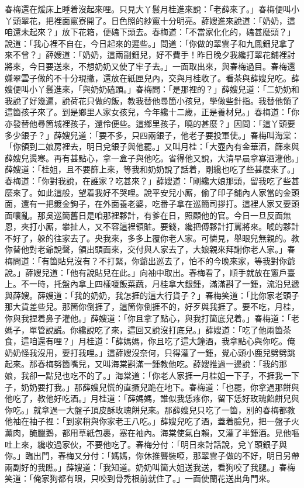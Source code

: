 春梅還在煖床上睡着沒起來哩。{}只見大丫鬟月桂進來說：「老薛來了。」春梅便叫小丫頭翠花，把裡面窻寮開了。日色照的紗窻十分明亮。薛嫂進來說道：「奶奶，這咱還未起來？」放下花箱，便磕下頭去。春梅道：「不當家化化的，磕甚麼頭？」說道：「我心裡不自在，今日起來的遲些。」問道：「你做的翠雲子和九鳳鈿兒拿了來不曾？」薛嫂道：「奶奶，這兩副鈿兒，好不費手！昨日晚夕我纔打翠花鋪裡討將來，今日要送來，不想奶奶又使了牢子去。」一面取出來，與春梅過目。春梅還嫌翠雲子做的不十分現撇，{}還放在紙匣兒內，交與月桂收了。看茶與薛嫂兒吃。薛嫂便叫小丫鬟進來，「與奶奶磕頭。」春梅問：「是那裡的？」薛嫂兒道：「二奶奶和我說了好幾遍，說荷花只做的飯，教我替他尋箇小孩兒，學做些針指。我替他領了這箇孩子來了。到是鄉里人家女孩兒，今年纔十二歲，正是養材兒。」春梅道：「你亦發替他尋箇城裡孩子，還伶便些。這鄉里孩子，曉的甚麼？」因問：「這丫頭要多少銀子？」薛嫂兒道：「要不多，只四兩銀子，他老子要投軍使。」春梅叫海棠：「你領到二娘房裡去，明日兌銀子與他罷。」又叫月桂：「大壺內有金華酒，篩來與薛嫂兒燙寒。再有甚點心，拿一盒子與他吃。省得他又說，大清早晨拿寡酒灌他。」薛嫂道：「桂姐，且不要篩上來，等我和奶奶說了話着，剛纔也吃了些甚麼來了。」春梅道：「你對我說，在誰家？吃甚來？」薛嫂道：「剛纔大娘那頭，留我吃了些甚麼來了。如此這般，望着我好不哭哩。說平安兒小厮，偷了印子鋪內人家當的金頭面，還有一把鍍金鉤子，在外面養老婆，吃番子拿在巡簡司拶打。這裡人家又要頭面嚷亂。那吳巡簡舊日是咱那裡夥計，有爹在日，照顧他的官。今日一旦反面無恩，夾打小厮，攀扯人，又不容這裡領賍。要錢，纔把傅夥計打罵將來。唬的夥計不好了，躲的往家去了。央我來，多多上覆你老人家。可憐見，舉眼兒無親的。教你替他對老爺說聲，領出頭面來，交付與人家去了，大娘親來拜謝你老人家。」春梅問道：「有箇貼兒沒有？不打緊，你爺出巡去了，怕不的今晚來家，等我對你爺說。」{}薛嫂兒道：「他有說貼兒在此。」向袖中取出。春梅看了，順手就放在窻戶臺上。不一時，托盤內拿上四樣嗄飯菜蔬，月桂拿大銀鍾，滿滿斟了一鍾，流沿兒遞與薛嫂。薛嫂道：「我的奶奶，我怎捱的這大行貨子？」春梅笑道：「比你家老頭子那大貨差些兒。{}那箇你倒捱了，這箇你倒捱不的，好歹與我捱了。要不吃，月桂，你與我捏着鼻子灌他。」薛嫂道：「你且拿了點心，與我打箇底兒着。」春梅道：「老媽子，單管說謊。你纔說吃了來，這回又說沒打底兒。」薛嫂道：「吃了他兩箇茶食，這咱還有哩？」月桂道：「薛媽媽，你且吃了這大鐘酒，我拿點心與你吃。俺奶奶怪我沒用，要打我哩。」這薛嫂沒奈何，只得灌了一鍾，覺心頭小鹿兒劈劈跳起來。那春梅努箇嘴兒，又叫海棠斟滿一鍾教他吃。薛嫂推過一邊說：「我的那娘，我卻一點兒也吃不的了。」海棠道：「你老人家捱一月桂姐一下子，不捱我一下子，奶奶要打我。」那薛嫂兒慌的直撅兒跪在地下。春梅道：「也罷，你拿過那餅與他吃了，教他好吃酒。」月桂道：「薛媽媽，誰似我恁疼你，留下恁好玫瑰餡餅兒與你吃。」就拿過一大盤子頂皮酥玫瑰餅兒來。那薛嫂兒只吃了一箇，別的春梅都教他袖在袖子裡：「到家稍與你家老王八吃。」薛嫂兒吃了酒，蓋着臉兒，把一盤子火薰肉，醃臘鵝，都用草紙包裹，塞在袖內。{}海棠使氣白賴，又灌了半鍾酒。見他嘔吐上來，纔收過家伙，不要他吃了。春梅分付：「明日來討話說，兌丫頭銀子與你。」臨出門，春梅又分付：「媽媽，你休推聾裝啞，那翠雲子做的不好，明日另帶兩副好的我瞧。」薛嫂道：「我知道。奶奶叫箇大姐送我送，看狗咬了我腿。」春梅笑道：「俺家狗都有眼，只咬到骨禿根前就住了。」{}一面使蘭花送出角門來。

